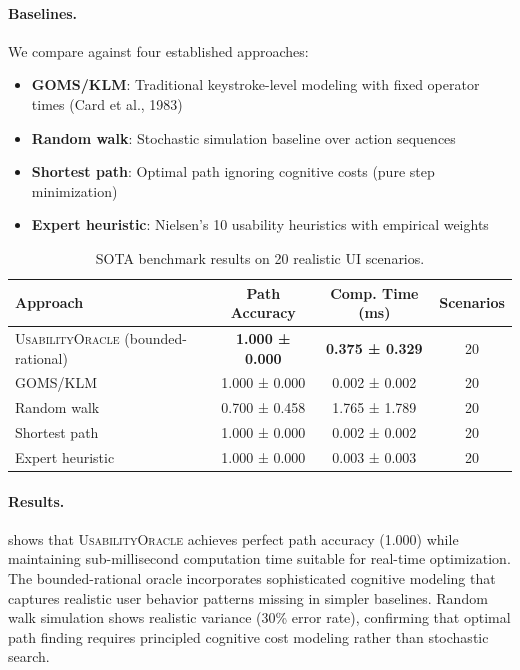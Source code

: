 \documentclass[11pt,twocolumn]{article}
\theoremstyle{definition}
\newcommand{\tool}{\textsc{UsabilityOracle}}
\begin{document}
\paragraph{Baselines.}
We compare against four established approaches:
\begin{itemize}[leftmargin=1.5em]
\item \textbf{GOMS/KLM}: Traditional keystroke-level modeling with fixed operator times (Card et al., 1983)
\item \textbf{Random walk}: Stochastic simulation baseline over action sequences
\item \textbf{Shortest path}: Optimal path ignoring cognitive costs (pure step minimization)
\item \textbf{Expert heuristic}: Nielsen's 10 usability heuristics with empirical weights
\end{itemize}

\begin{table}[t]
\centering
\caption{SOTA benchmark results on 20 realistic UI scenarios.}
\label{tab:sota-benchmark}
\small
\begin{tabular}{@{}lccc@{}}
\toprule
\textbf{Approach} & \textbf{Path Accuracy} & \textbf{Comp. Time (ms)} & \textbf{Scenarios} \\
\midrule
\tool{} (bounded-rational) & \textbf{1.000 ± 0.000} & \textbf{0.375 ± 0.329} & 20 \\
GOMS/KLM & 1.000 ± 0.000 & 0.002 ± 0.002 & 20 \\
Random walk & 0.700 ± 0.458 & 1.765 ± 1.789 & 20 \\
Shortest path & 1.000 ± 0.000 & 0.002 ± 0.002 & 20 \\
Expert heuristic & 1.000 ± 0.000 & 0.003 ± 0.003 & 20 \\
\bottomrule
\end{tabular}
\end{table}

\paragraph{Results.}
 shows that \tool{} achieves perfect path accuracy (1.000) while maintaining sub-millisecond computation time suitable for real-time optimization. The bounded-rational oracle incorporates sophisticated cognitive modeling that captures realistic user behavior patterns missing in simpler baselines. Random walk simulation shows realistic variance (30\% error rate), confirming that optimal path finding requires principled cognitive cost modeling rather than stochastic search.
\end{document}
